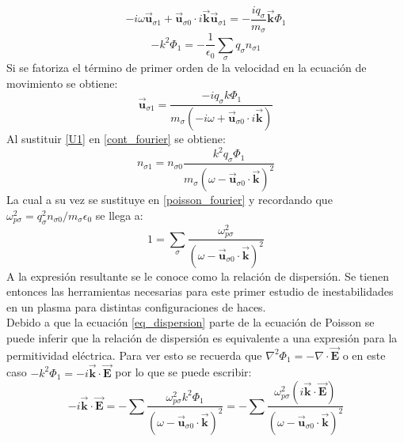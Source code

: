 \documentclass[../tesis_main_file.tex]{subfiles}
\begin{document}
\begin{equation}
\label{eq_mov_fourier}
-i \omega \overrightarrow{\textbf{u}}_{\sigma 1} + \overrightarrow{\textbf{u}}_{\sigma 0} \cdot i \overrightarrow{\textbf{k}}\overrightarrow{\textbf{u}}_{\sigma 1} = - \frac{i q_{\sigma}}{m_{\sigma}} \overrightarrow{\textbf{k}}\Phi _1
\end{equation}
\begin{equation}
\label{poisson_fourier}
-k^2 \Phi _1 = -\frac{1}{\epsilon_0}\sum _{\sigma}q_{\sigma} n_{\sigma 1}
\end{equation}
Si se fatoriza el término de primer orden de la velocidad en la ecuación de movimiento se obtiene:
\begin{equation}
\label{U1}
\overrightarrow{\textbf{u}}_{\sigma 1} = \frac{- i q_{\sigma} k \Phi _1}{m_{\sigma}(-i \omega + \overrightarrow{\textbf{u}}_{\sigma 0} \cdot i \overrightarrow{\textbf{k}})}
\end{equation}
Al sustituir \ref{U1} en \ref{cont_fourier} se obtiene:
\begin{equation}
n_{\sigma 1} = n_{\sigma 0}\frac{k^2 q_{\sigma} \Phi _1  }{m_{\sigma}(\omega - \overrightarrow{\textbf{u}}_{\sigma 0} \cdot \overrightarrow{\textbf{k}})^2 }
\end{equation}
La cual a su vez se sustituye en \ref{poisson_fourier} y recordando que $\omega_{p \sigma}^2 = q_{\sigma}^2 n_{\sigma 0} / m_{\sigma} \epsilon_0$ se llega a:
\begin{equation}
\label{eq_dispersion}
1 = \sum_{\sigma} \frac{\omega_{p \sigma}^2}{(\omega - \overrightarrow{\textbf{u}}_{\sigma 0} \cdot \overrightarrow{\textbf{k}})^2}
\end{equation}
A la expresión resultante se le conoce como la relación de dispersión. Se tienen entonces las herramientas necesarias para este primer estudio de inestabilidades en un plasma para distintas configuraciones de haces.\\
Debido a que la ecuación \ref{eq_dispersion} parte de la ecuación de Poisson se puede inferir que la relación de dispersión es equivalente a una expresión para la permitividad eléctrica. Para ver esto se recuerda que
$\nabla ^2 \Phi _1 = - \nabla \cdot \overrightarrow{\textbf{E}}$ o en este caso $-k^2 \Phi _1 = -i \overrightarrow{\textbf{k}} \cdot \overrightarrow{\textbf{E}}$ por lo que se puede escribir:
\begin{equation}
-i \overrightarrow{\textbf{k}} \cdot \overrightarrow{\textbf{E}} = - \sum \frac{\omega_{p \sigma}^2 k^2 \Phi _1}{(\omega - \overrightarrow{\textbf{u}}_{\sigma 0} \cdot \overrightarrow{\textbf{k}})^2} = - \sum \frac{\omega_{p \sigma}^2 (i \overrightarrow{\textbf{k}} \cdot \overrightarrow{\textbf{E}})}{(\omega - \overrightarrow{\textbf{u}}_{\sigma 0} \cdot \overrightarrow{\textbf{k}})^2}
\end{equation}
\end{document}
